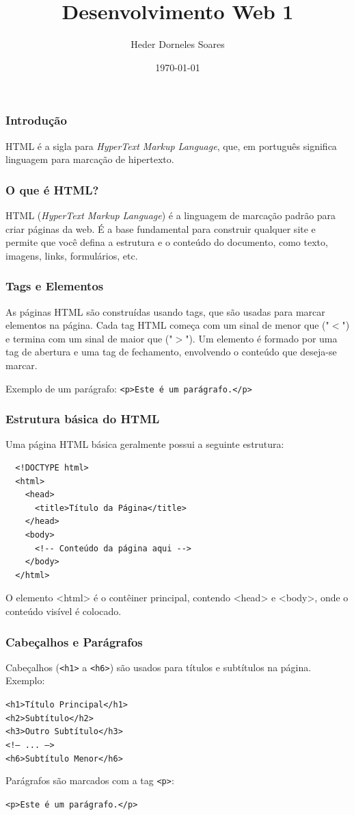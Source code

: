 \documentclass{beamer}
\author{Heder Dorneles Soares}
\title{Desenvolvimento Web 1}
\institute{IFSP}
\date{\today}
\begin{document}
\begin{frame}
  \titlepage
\end{frame}



\begin{frame}
  \frametitle{Introdução}
  HTML é a sigla para \textit{HyperText Markup Language}, que, em português significa linguagem para marcação de hipertexto.
\end{frame}

\begin{frame}
  \frametitle{O que é HTML?}
  HTML (\textit{HyperText Markup Language}) é a linguagem de marcação padrão para criar páginas da web. É a base fundamental para construir qualquer site e permite que você defina a estrutura e o conteúdo do documento, como texto, imagens, links, formulários, etc.
\end{frame}

\begin{frame}
  \frametitle{Tags e Elementos}
  As páginas HTML são construídas usando tags, que são usadas para marcar elementos na página. Cada tag HTML começa com um sinal de menor que ("\(<\)") e termina com um sinal de maior que ("\(>\)"). Um elemento é formado por uma tag de abertura e uma tag de fechamento, envolvendo o conteúdo que deseja-se marcar.

  Exemplo de um parágrafo:
  \texttt{<p>Este é um parágrafo.</p>}
\end{frame}

\begin{frame}[fragile] %
  \frametitle{Estrutura básica do HTML}
  Uma página HTML básica geralmente possui a seguinte estrutura:

  \begin{verbatim}
  <!DOCTYPE html>
  <html>
    <head>
      <title>Título da Página</title>
    </head>
    <body>
      <!-- Conteúdo da página aqui -->
    </body>
  </html>
  \end{verbatim}

  O elemento <html> é o contêiner principal, contendo <head> e <body>, onde o conteúdo visível é colocado.
\end{frame}

\begin{frame}
  \frametitle{Cabeçalhos e Parágrafos}
  Cabeçalhos (\texttt{<h1>} a \texttt{<h6>}) são usados para títulos e subtítulos na página. Exemplo:

  \texttt{<h1>Título Principal</h1>}\\
  \texttt{<h2>Subtítulo</h2>}\\
  \texttt{<h3>Outro Subtítulo</h3>}\\
  \texttt{<!-- ... -->}\\
  \texttt{<h6>Subtítulo Menor</h6>}

  Parágrafos são marcados com a tag \texttt{<p>}:

  \texttt{<p>Este é um parágrafo.</p>}
\end{frame}
\end{document}
